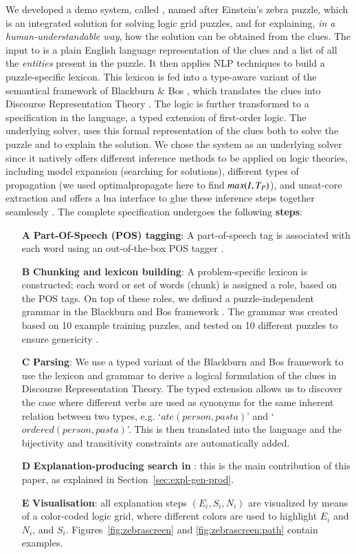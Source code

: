 We developed a demo system, called \ourtool, named after Einstein's zebra puzzle, which is an integrated solution for solving logic grid puzzles, and for explaining,  \textit{in a human-understandable way}, how the solution can be obtained from the clues. 
The input to \ourtool is a plain English language representation of the clues and a list of all the \textit{entities} present in the puzzle. It then applies NLP techniques to build a puzzle-specific lexicon. This lexicon is fed into a type-aware variant of the semantical framework of Blackburn \& Bos \cite{Blackburn2005,Blackburn2006}, which translates the clues into Discourse Representation Theory \cite{DRT}. The logic is further transformed to a specification in the \idp language, a typed extension of first-order logic. 
% 
The underlying solver, \idp\cite{IDP} uses this formal representation of the clues both to solve the puzzle and to explain the solution. 
We chose the \idp system as an underlying solver since it natively offers different inference methods to be applied on logic theories, including model expansion (searching for solutions), different types of propagation (we used optimalpropagate here to find $max(I,T_P)$), and unsat-core extraction and offers a lua interface to glue these inference steps together seamlessly \cite{IDP}. 
The complete specification undergoes the following \textbf{steps}:
\begin{enumerate}
	\item[\bf A] \textbf{Part-Of-Speech (POS) tagging}: A part-of-speech tag is associated with each word using an out-of-the-box POS tagger \cite{DBLP:journals/coling/MarcusSM94}.
	\item[\bf B] \textbf{Chunking and lexicon building}: A problem-specific lexicon is constructed; each word or set of words (chunk) is assigned a role, based on the POS tags. On top of these roles, we defined a puzzle-independent grammar in the Blackburn and Bos framework \cite{Blackburn2005,Blackburn2006}. The grammar was created based on 10 example training puzzles, and tested on 10 different puzzles to ensure genericity \cite{msc/Claes17}. 
	\item[\bf C] \textbf{Parsing}: We use a typed variant of the Blackburn and Bos framework to use the lexicon and grammar to derive a logical formulation of the clues in Discourse Representation Theory. The typed extension allows us to discover the case where different verbs are used as synonyms for the same inherent relation between two types, e.g. `$ate(person, pasta)$' and `$ordered(person, pasta)$'. This is then translated into the \idp language and the bijectivity and transitivity constraints are automatically added. 
	\item[\bf D] \textbf{Explanation-producing search in \idp}: this is the main contribution of this paper, as explained in Section~\ref{sec:expl-gen-prod}.
	\item[\bf E] \textbf{Visualisation}: all  explanation steps $(E_i, S_i, N_i)$ are visualized by means of a color-coded logic grid, where different colors are used to highlight $E_i$ and $N_i$, and $S_i$. Figures~\ref{fig:zebrascreen} and \ref{fig:zebrascreen:path} contain examples.
\end{enumerate}

